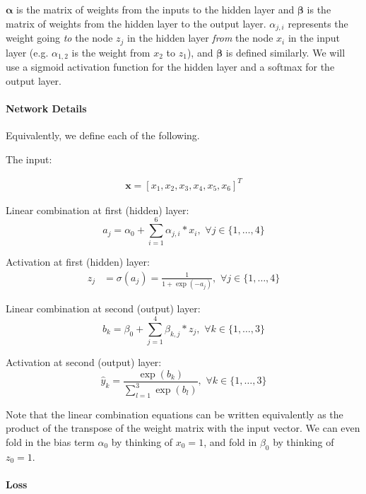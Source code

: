 \documentclass[11pt]{article}
\numberwithin{equation}{section} %
\numberwithin{figure}{section} %
\numberwithin{table}{section} %
\newcommand{\xv}{\mathbf{x}}
\begin{document}
$\boldsymbol{\alpha}$ is the matrix of weights from the inputs to the hidden layer and $\boldsymbol{\beta}$ is the matrix of weights from the hidden layer to the output layer. 
$\alpha_{j,i}$ represents the weight going \textit{to} the node $z_j$ in the hidden layer \textit{from} the node $x_i$ in the input layer (e.g. $\alpha_{1,2}$ is the weight from $x_2$ to $z_1$), and $\boldsymbol{\beta}$ is defined similarly. We will use a sigmoid activation function for the hidden layer and a softmax for the output layer. 

\paragraph{Network Details}

Equivalently, we define each of the following. 

The input:

\begin{align}
\xv=[x_1,x_2,x_3,x_4,x_5,x_6]^T
\end{align}

Linear combination at first (hidden) layer:
\begin{equation}
a_j= \alpha_0 + \sum_{i=1}^6 \alpha_{j,i}*x_i,\,\, \forall j \in \{1,\ldots,4\}
\end{equation}

Activation at first (hidden) layer:
\begin{align}
z_j &= \sigma(a_j) = \frac{1}{1+\exp(-a_j)},\,\, \forall j \in \{1,\ldots,4\}
\end{align}

Linear combination at second (output) layer:
\begin{equation}
b_k = \beta_0 + \sum_{j=1}^4 \beta_{k,j}*z_j,\,\, \forall k \in \{1,\ldots,3\}
\end{equation}

Activation at second (output) layer:
\begin{equation}
\hat{y}_k = \frac{\exp(b_k)}{\sum\limits_{l=1}^3 \exp(b_l)},\,\, \forall k \in \{1,\ldots,3\}
\end{equation}

Note that the linear combination equations can be written equivalently as the product of the transpose of the weight matrix with the input vector. We can even fold in the bias term $\alpha_0$ by thinking of $x_0 = 1$, and fold in $\beta_0$ by thinking of $z_0 = 1$.

\paragraph{Loss}
\end{document}
